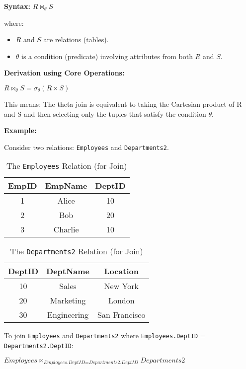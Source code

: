 \documentclass[12pt]{book}
\begin{document}
\textbf{Syntax:} $\mathit{R} \Join_{\theta} \mathit{S}$

where:
\begin{itemize}
    \item $\mathit{R}$ and $\mathit{S}$ are relations (tables).
    \item $\theta$ is a condition (predicate) involving attributes from both $\mathit{R}$ and $\mathit{S}$.
\end{itemize}

\textbf{Derivation using Core Operations:}

$\mathit{R} \Join_{\theta} \mathit{S} = \sigma_{\theta}(\mathit{R} \times \mathit{S})$

This means: The theta join is equivalent to taking the Cartesian product of R and S and then selecting only the tuples that satisfy the condition $\theta$.

\textbf{Example:}

Consider two relations: \texttt{Employees} and \texttt{Departments2}.

\begin{table}[htbp]
\centering
\begin{tabular}{@{}ccc@{}}
\toprule
EmpID & EmpName & DeptID \\
\midrule
1 & Alice & 10 \\
2 & Bob & 20 \\
3 & Charlie & 10 \\
\bottomrule
\end{tabular}
\caption{The \texttt{Employees} Relation (for Join)}
\label{tab:employees_join}
\end{table}

\begin{table}[htbp]
\centering
\begin{tabular}{@{}ccc@{}}
\toprule
DeptID & DeptName & Location \\
\midrule
10 & Sales & New York \\
20 & Marketing & London \\
30 & Engineering & San Francisco \\
\bottomrule
\end{tabular}
\caption{The \texttt{Departments2} Relation (for Join)}
\label{tab:departments2_join}
\end{table}

To join \texttt{Employees} and \texttt{Departments2} where \texttt{Employees.DeptID} = \texttt{Departments2.DeptID}:

$\mathit{Employees} \Join_{\textit{Employees.DeptID} = \textit{Departments2.DeptID}} \mathit{Departments2}$
\end{document}
